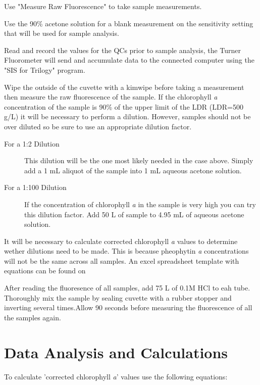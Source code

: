 \documentclass[12pt]{../SOP3_alpha}
\begin{document}
\NP Use "Measure Raw Fluorescence" to take sample measurements.

\NP Use the 90\% acetone solution for a blank measurement on the sensitivity setting that will be used for sample analysis. %

\NP Read and record the values for the QCs prior to sample analysis, the Turner Fluorometer will send and accumulate data to the connected computer using the "SIS for Trilogy" program.

\NP Wipe the outside of the cuvette with a kimwipe before taking a measurement then measure the raw fluorescence of the sample. If the chlorophyll \textit{a} concentration of the sample is 90\% of the upper limit of the LDR (LDR=500 \micro g/L) it will be necessary to perform a dilution. However, samples should not be over diluted so be sure to use an appropriate dilution factor. 

\begin{description} 
\item[For a 1:2 Dilution] This dilution will be the one most likely needed in the case above. Simply add a 1 mL aliquot of the sample into 1 mL aqueous acetone solution.
\item[For a 1:100 Dilution] If the concentration of chlorophyll \textit{a} in the sample is very high you can try this dilution factor. Add 50 \micro L of sample to 4.95 mL of aqueous acetone solution. 
\end{description}

\NP It will be necessary to calculate corrected chlorophyll \textit{a} values to determine wether dilutions need to be made. This is because pheophytin \textit{a} concentrations will not be the same across all samples. An excel spreadsheet template with equations can be found on %

\NP After reading the fluoresence of all samples, add 75 \micro L of  0.1M HCl to eah tube. Thoroughly mix the sample by sealing cuvette with a rubber stopper and inverting several times.Allow 90 seconds before measuring the fluorescence of all the samples again. 

\section{Data Analysis and Calculations}
To calculate 'corrected chlorophyll \textit{a}' values use the following equations: %
\end{document}

